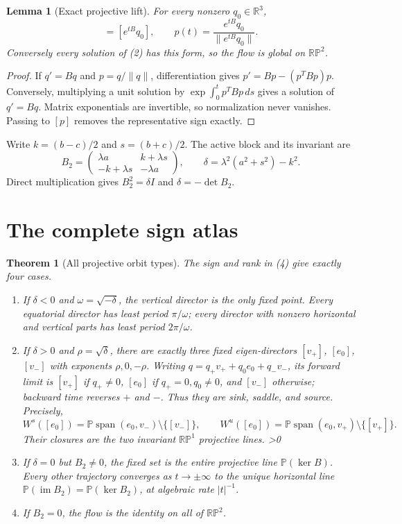 \documentclass[10pt]{article}
\providecommand{\CRevisionRound}{2}
\newtheorem{theorem}{Theorem}
\newtheorem{lemma}{Lemma}
\newcommand{\RP}{\mathbb{RP}}
\newcommand{\Span}{\operatorname{span}}
\begin{document}
\begin{lemma}[Exact projective lift]
For every nonzero $q_0\in\mathbb R^3$,
\begin{equation}
 [p(t)]=[e^{tB}q_0],\qquad
 p(t)=\frac{e^{tB}q_0}{\lVert e^{tB}q_0\rVert}. \tag{3}
\end{equation}
Conversely every solution of (2) has this form, so the flow is global on
$\RP^2$.
\end{lemma}
\begin{proof}
If $q'=Bq$ and $p=q/\lVert q\rVert$, differentiation gives
$p'=Bp-(p^TBp)p$.  Conversely, multiplying a unit solution by
$\exp\int_0^t p^TBp\,ds$ gives a solution of $q'=Bq$.  Matrix exponentials are
invertible, so normalization never vanishes.  Passing to $[p]$ removes the
representative sign exactly.
\end{proof}

Write $k=(b-c)/2$ and $s=(b+c)/2$.  The active block and its invariant are
\begin{equation}
 B_2=\begin{pmatrix}\lambda a&k+\lambda s\\-k+\lambda s&-\lambda a\end{pmatrix},
 \qquad
 \delta=\lambda^2(a^2+s^2)-k^2. \tag{4}
\end{equation}
Direct multiplication gives $B_2^2=\delta I$ and $\delta=-\det B_2$.

\section{The complete sign atlas}
\begin{theorem}[All projective orbit types]
The sign and rank in (4) give exactly four cases.

\begin{enumerate}
\item If $\delta<0$ and $\omega=\sqrt{-\delta}$, the vertical director is
the only fixed point.  Every equatorial director has least period $\pi/\omega$;
every director with nonzero horizontal and vertical parts has least period
$2\pi/\omega$.
\item If $\delta>0$ and $\rho=\sqrt\delta$, there are exactly three fixed
eigen-directors $[v_+]$, $[e_0]$, $[v_-]$ with exponents $\rho,0,-\rho$.
Writing $q=q_+v_++q_0e_0+q_-v_-$, its forward limit is $[v_+]$ if
$q_+\ne0$, $[e_0]$ if $q_+=0,q_0\ne0$, and $[v_-]$ otherwise; backward time
reverses $+$ and $-$.  Thus they are sink, saddle, and source.  Precisely,
\[
 W^s([e_0])=\mathbb P\Span(e_0,v_-)\setminus\{[v_-]\},\qquad
 W^u([e_0])=\mathbb P\Span(e_0,v_+)\setminus\{[v_+]\}.
\]
Their closures are the two invariant $\RP^1$ projective lines.
\ifnum\CRevisionRound>0
\item If $\delta=0$ but $B_2\ne0$, the fixed set is the entire projective line
$\mathbb P(\ker B)$.  Every other trajectory converges as $t\to\pm\infty$ to
the unique horizontal line $\mathbb P(\operatorname{im}B_2)
=\mathbb P(\ker B_2)$, at algebraic rate $|t|^{-1}$.
\item If $B_2=0$, the flow is the identity on all of $\RP^2$.
\fi
\end{enumerate}
\end{theorem}
\end{document}
